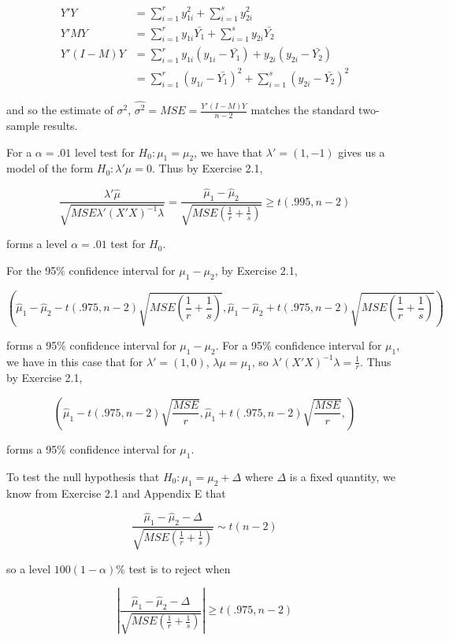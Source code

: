 \documentclass{article}
\begin{document}
\begin{align*}
Y'Y &= \sum_{i=1}^r y_{1i}^2 + \sum_{i=1}^s y_{2i}^2 \\
Y'MY &= \sum_{i=1}^r y_{1i}\bar{Y_1} + \sum_{i=1}^s y_{2i}\bar{Y_2} \\
Y'(I-M)Y &= \sum_{i=1}^r y_{1i}(y_{1i}-\bar{Y_1}) + y_{2i}(y_{2i}-\bar{Y_2})  \\
&= \sum_{i=1}^r (y_{1i}-\bar{Y_1})^2 + \sum_{i=1}^s (y_{2i}-\bar{Y_2})^2
\end{align*}

and so the estimate of $\sigma^2$, $\hat{\sigma^2} =MSE = \frac{Y'(I-M)Y}{n-2}$ matches the standard two-sample results.

For a $\alpha=.01$ level test for $H_0:\mu_1 = \mu_2$, we have that $\lambda'=(1, -1)$ gives us a model of the form $H_0: \lambda'\mu = 0$. Thus by Exercise 2.1,

\[
\frac{
\lambda'\hat{\mu}
}{
\sqrt{
MSE \lambda'(X'X)^{-1}\lambda
}
} =
\frac{
\hat{\mu}_1 - \hat{\mu}_2
}{
\sqrt{
MSE (\frac{1}{r} + \frac{1}{s})
}
}
\geq t(.995, n-2)
\]

forms a level $\alpha=.01$ test for $H_0$.

For the 95\% confidence interval for $\mu_1-\mu_2$, by Exercise 2.1,

\[
\left(
\hat{\mu}_1-\hat{\mu}_2 - t(.975, n-2)\sqrt{MSE\left(\frac{1}{r}+\frac{1}{s}\right)},  \hat{\mu}_1-\hat{\mu}_2 + t(.975, n-2)\sqrt{MSE\left(\frac{1}{r}+\frac{1}{s}\right)}
\right)
\]

forms a 95\% confidence interval for $\mu_1-\mu_2$. For a 95\% confidence interval for $\mu_1$, we have in this case that for $\lambda'=(1, 0)$, $\lambda \mu = \mu_1$, so $\lambda'(X'X)^{-1}\lambda = \frac{1}{r}$. Thus by Exercise 2.1,

\[
\left(
\hat{\mu}_1 - t(.975, n-2)\sqrt{\frac{MSE}{r}}, \hat{\mu}_1 + t(.975, n-2)\sqrt{\frac{MSE}{r}}, 
\right)
\]

forms a 95\% confidence interval for $\mu_1$.

To test the null hypothesis that $H_0: \mu_1=\mu_2 + \Delta$ where $\Delta$ is a fixed quantity, we know from Exercise 2.1 and Appendix E that

\[
\frac{\hat{\mu}_1-\hat{\mu}_2 - \Delta}{
\sqrt{MSE\left( \frac{1}{r} + \frac{1}{s} \right)}
} \sim t(n-2)
\]

so a level $100(1-\alpha)$\% test is to reject when

\[
\left|
\frac{\hat{\mu}_1-\hat{\mu}_2 - \Delta}{
\sqrt{MSE\left( \frac{1}{r} + \frac{1}{s} \right)}
}
\right| \geq
t(.975, n-2)
\]
 
\end{document}
